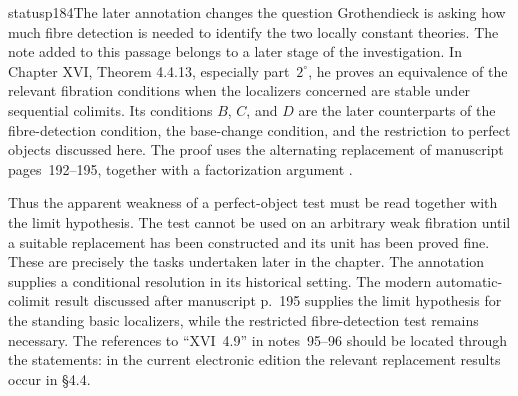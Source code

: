 \begin{dcomment}{status}{p184}{The later annotation changes the question}
Grothendieck is asking how much fibre detection is needed to identify the two locally constant theories. The note added to this passage belongs to a later stage of the investigation. In Chapter XVI, Theorem 4.4.13, especially part~$2^\circ$, he proves an equivalence of the relevant fibration conditions when the localizers concerned are stable under sequential colimits. Its conditions $B$, $C$, and $D$ are the later counterparts of the fibre-detection condition, the base-change condition, and the restriction to perfect objects discussed here. The proof uses the alternating replacement of manuscript pages~192--195, together with a factorization argument \citep[\S4.4, especially Corollaries~4.4.10--4.4.12 and Theorem~4.4.13]{Grothendieck1991XVI}.

Thus the apparent weakness of a perfect-object test must be read together with the limit hypothesis. The test cannot be used on an arbitrary weak fibration until a suitable replacement has been constructed and its unit has been proved fine. These are precisely the tasks undertaken later in the chapter. The annotation supplies a conditional resolution in its historical setting. The modern automatic-colimit result discussed after manuscript p.~195 supplies the limit hypothesis for the standing basic localizers, while the restricted fibre-detection test remains necessary. The references to ``XVI~4.9'' in notes~95--96 should be located through the statements: in the current electronic edition the relevant replacement results occur in \S4.4.
\end{dcomment}

